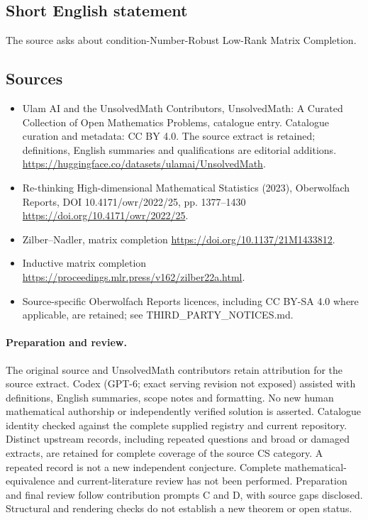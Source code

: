 \documentclass[11pt]{article}
\begin{document}
\subsection{Short English statement}
The source asks about condition-Number-Robust Low-Rank Matrix Completion.
\subsection{Sources}
\begin{itemize}
\item[\hypertarget{source:statement:1}{S1}] Ulam AI and the UnsolvedMath Contributors, UnsolvedMath: A Curated Collection of Open Mathematics Problems, catalogue entry. Catalogue curation and metadata: CC BY 4.0. The source extract is retained; definitions, English summaries and qualifications are editorial additions.
\url{https://huggingface.co/datasets/ulamai/UnsolvedMath}.
\item[\hypertarget{source:statement:2}{S2}] Re-thinking High-dimensional Mathematical Statistics (2023), Oberwolfach Reports, DOI 10.4171/owr/2022/25, pp. 1377--1430
\url{https://doi.org/10.4171/owr/2022/25}.
\item[\hypertarget{source:statement:3}{S3}] Zilber--Nadler, matrix completion
\url{https://doi.org/10.1137/21M1433812}.
\item[\hypertarget{source:statement:4}{S4}] Inductive matrix completion
\url{https://proceedings.mlr.press/v162/zilber22a.html}.
\item Source-specific Oberwolfach Reports licences, including CC BY-SA 4.0 where applicable, are retained; see THIRD\_PARTY\_NOTICES.md.
\end{itemize}
\paragraph{Preparation and review.}
The original source and UnsolvedMath contributors retain attribution for the source extract. Codex (GPT-6; exact serving revision not exposed) assisted with definitions, English summaries, scope notes and formatting. No new human mathematical authorship or independently verified solution is asserted. Catalogue identity checked against the complete supplied registry and current repository. Distinct upstream records, including repeated questions and broad or damaged extracts, are retained for complete coverage of the source CS category. A repeated record is not a new independent conjecture. Complete mathematical-equivalence and current-literature review has not been performed. Preparation and final review follow contribution prompts C and D, with source gaps disclosed. Structural and rendering checks do not establish a new theorem or open status.
\label{end:statement}
\end{document}
